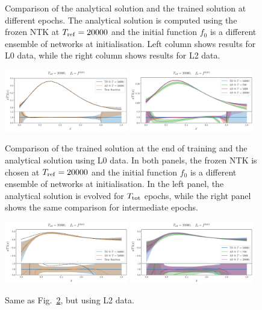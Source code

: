 \begin{figure}[ht!]
    \caption{Comparison of the analytical solution and the trained solution at
    different epochs. The analytical solution is computed using the frozen NTK
    at $T_{\rm ref} = 20000$ and the initial function $f_0$ is a different
    ensemble of networks at initialisation. Left column shows results for L0
    data, while the right column shows results for L2 data.}
    \label{fig:xT3_analytical_vs_trained}
  \end{figure}

\begin{figure}[ht!]
  \centering
  \includegraphics[width=0.48\textwidth]{plots/analytical_solution/evolution/evolution_epoch_50000_L0.pdf}
  \includegraphics[width=0.48\textwidth]{plots/analytical_solution/evolution/evolution_epochs_700_5000_20000_L0.pdf}
  \caption{Comparison of the trained solution at the end of training and
  the analytical solution using L0 data. In both panels, the
  frozen NTK is chosen at $T_{\rm ref} = 20000$ and the initial function $f_0$
  is a different ensemble of networks at initialisation. In the left panel,
  the analytical solution is evolved for $T_{\rm tot}$ epochs, while the right
  panel shows the same comparison for intermediate epochs.}
  \label{fig:xT3_analytical_init_L0}
\end{figure}

\begin{figure}[ht!]
\centering
\includegraphics[width=0.48\textwidth]{plots/analytical_solution/evolution/evolution_epoch_50000_L2.pdf}
  \includegraphics[width=0.48\textwidth]{plots/analytical_solution/evolution/evolution_epochs_700_5000_20000_L2.pdf}
\caption{Same as Fig.~\ref{fig:xT3_analytical_init_L0}, but using L2 data.}
\label{fig:xT3_analytical_init_L2}
\end{figure}

